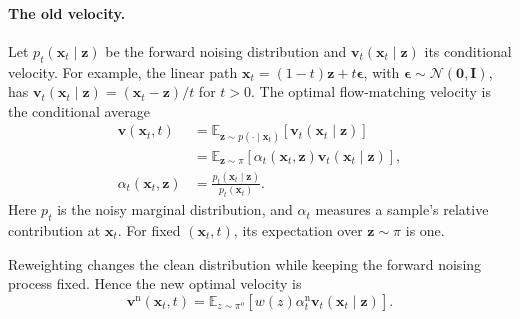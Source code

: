 \documentclass{article} %
\begin{document}
\paragraph{The old velocity.}
Let $p_t(\mathbf x_t\mid\mathbf z)$ be the forward noising distribution and
$\mathbf v_t(\mathbf x_t\mid\mathbf z)$ its conditional velocity. For example,
the linear path $\mathbf x_t=(1-t)\mathbf z+t\boldsymbol\epsilon$, with
$\boldsymbol\epsilon\sim\mathcal N(\mathbf 0,\mathbf I)$, has
$\mathbf v_t(\mathbf x_t\mid\mathbf z)=(\mathbf x_t-\mathbf z)/t$ for $t>0$.
The optimal flow-matching velocity is the conditional average
\begin{align}
\mathbf v(\mathbf x_t,t)
&=\mathbb E_{\mathbf z\sim p(\cdot\mid\mathbf x_t)}
  [\mathbf v_t(\mathbf x_t\mid\mathbf z)]
\nonumber\\
&=\mathbb E_{\mathbf z\sim\pi}
  [\alpha_t(\mathbf x_t,\mathbf z)
   \mathbf v_t(\mathbf x_t\mid\mathbf z)],
\nonumber\\
\alpha_t(\mathbf x_t,\mathbf z)
&=\frac{p_t(\mathbf x_t\mid\mathbf z)}{p_t(\mathbf x_t)}.
\label{eq:old-velocity}
\end{align}
Here $p_t$ is the noisy marginal distribution, and
$\alpha_t$ measures a sample's relative contribution at
$\mathbf x_t$. For fixed $(\mathbf x_t,t)$, its expectation over
$\mathbf z\sim\pi$ is one.


Reweighting changes the clean distribution while keeping the forward noising
process fixed. Hence the new optimal velocity is
\begin{equation}
\mathbf v^{\mathrm{n}}(\mathbf x_t,t)
=\mathbb E_{z\sim\pi^{\mathrm{o}}}[w(z)\alpha_t^{\mathrm{n}}\mathbf v_t(\mathbf x_t\mid\mathbf z)].
\label{eq:new-velocity}
\end{equation}
\end{document}
